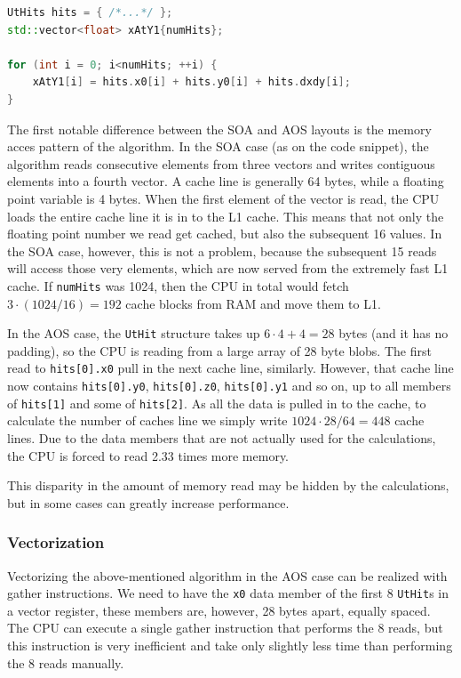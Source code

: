 \documentclass[12pt]{article}
\newcommand{\code}[1]{\texttt{#1}}
\begin{document}
\begin{lstlisting}[language=C++]
UtHits hits = { /*...*/ };
std::vector<float> xAtY1{numHits};

for (int i = 0; i<numHits; ++i) {
	xAtY1[i] = hits.x0[i] + hits.y0[i] + hits.dxdy[i];
}
\end{lstlisting}

The first notable difference between the SOA and AOS layouts is the memory acces pattern of the algorithm. In the SOA case (as on the code snippet), the algorithm reads consecutive elements from three vectors and writes contiguous elements into a fourth vector. A cache line is generally 64 bytes, while a floating point variable is 4 bytes. When the first element of the vector is read, the CPU loads the entire cache line it is in to the L1 cache. This means that not only the floating point number we read get cached, but also the subsequent 16 values. In the SOA case, however, this is not a problem, because the subsequent 15 reads will access those very elements, which are now served from the extremely fast L1 cache. If \code{numHits} was 1024, then the CPU in total would fetch $3 \cdot (1024/16) = 192$ cache blocks from RAM and move them to L1.

In the AOS case, the \code{UtHit} structure takes up $6 \cdot 4 + 4 = 28$ bytes (and it has no padding), so the CPU is reading from a large array of 28 byte blobs. The first read to \code{hits[0].x0} pull in the next cache line, similarly. However, that cache line now contains \code{hits[0].y0}, \code{hits[0].z0}, \code{hits[0].y1} and so on, up to all members of \code{hits[1]} and some of \code{hits[2]}. As all the data is pulled in to the cache, to calculate the number of caches line we simply write $1024 \cdot 28 / 64 = 448$ cache lines. Due to the data members that are not actually used for the calculations, the CPU is forced to read 2.33 times more memory.

This disparity in the amount of memory read may be hidden by the calculations, but in some cases can greatly increase performance.


\subsubsection{Vectorization}

Vectorizing the above-mentioned algorithm in the AOS case can be realized with gather instructions. We need to have the \code{x0} data member of the first 8 \code{UtHit}s in a vector register, these members are, however, 28 bytes apart, equally spaced. The CPU can execute a single gather instruction that performs the 8 reads, but this instruction is very inefficient and take only slightly less time than performing the 8 reads manually.
\end{document}
